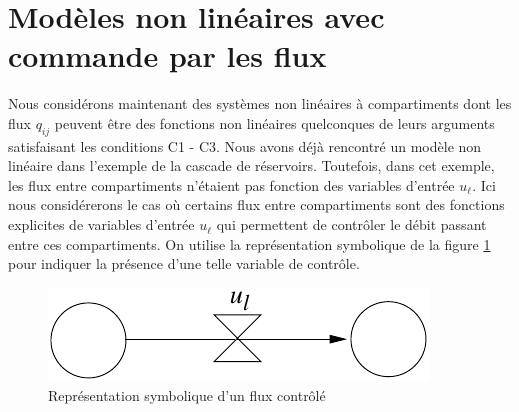 \section{Modèles non linéaires avec commande par les flux}

Nous considérons maintenant des systèmes non linéaires à compartiments
dont les flux
$q_{ij}$ peuvent être des fonctions non linéaires quelconques de
leurs arguments satisfaisant les conditions C1 - C3. Nous avons déjà rencontré
un modèle non linéaire dans l'exemple de la cascade de
réservoirs. Toutefois, dans cet exemple, les flux entre 
compartiments n'étaient pas fonction des variables d'entrée $u_{\ell}$. Ici nous
considérerons le cas où certains flux entre compartiments sont des fonctions
explicites de variables d'entrée $u_{\ell}$ qui permettent de contr\^oler le débit
passant entre ces compartiments.  On utilise la représentation
symbolique de la figure
\ref{Fig:contflux} pour indiquer la présence d'une telle variable de contr\^ole.
\begin{figure}[ht] 
\begin{center}
\includegraphics{images/contflux}
\caption{Représentation symbolique d'un flux contr\^olé}
\label{Fig:contflux}
\end{center} 
\end{figure}

